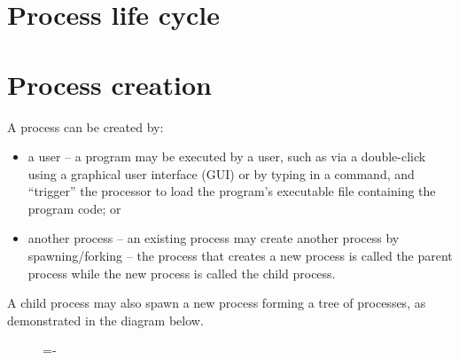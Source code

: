 \documentclass[a4paper]{systems-software}
\begin{document}
\section{Process life cycle}

\section*{Process creation}

A process can be created by:
\begin{itemize}
	\item a user -- a program may be executed by a user, such as via a double-click using a graphical user interface (GUI) or by typing in a command, and “trigger” the processor to load the program’s executable file containing the program code; or
	\item another process -- an existing process may create another process by spawning/forking – the process that creates a new process is called the parent process while the new process is called the child process.
\end{itemize}

A child process may also spawn a new process forming a tree of processes, as demonstrated in the diagram below.

\begin{figure}[H]
  \lineskip=-\fboxrule
\end{figure}
\end{document}
